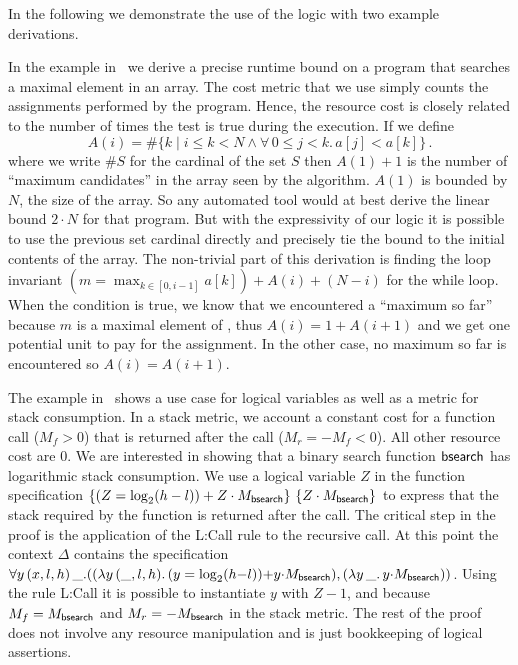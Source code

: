 \documentclass[nocopyrightspace,preprint,pldi]{sigplanconf-pldi15}
\newcommand{\pref}[1]{\prettyref{#1}}
\begin{document}
{In the following we demonstrate the use of the logic with two example
derivations.

In the example in~\pref{fig:xmplmax} we derive a precise runtime
bound on a program that searches a maximal element in an array.  The
cost metric that we use simply counts the assignments performed by the
program.  Hence, the resource cost is closely related to the
number of times the test  is true during the
execution.
%
If we define
$$
 A(i) =  \# \{ k \mid i \le k < N \land \forall\, 0 \le j < k.\, a[j] < a[k] \} \, .
$$
where we write $\# S$ for the cardinal of the set $S$ then $A(1)+1$ is
the number of ``maximum candidates'' in the array  seen
by the algorithm. $A(1)$ is bounded by $N$, the size of the array.
So any automated tool would at best derive the linear bound $2 \cdot
N$ for that program.  But with the expressivity of our logic it is
possible to use the previous set cardinal directly and precisely tie
the bound to the initial contents of the array.
%
The non-trivial part of this derivation is finding the loop invariant
$(m = \max_{k \in [0, i-1]} a[k]) + A(i) + (N-i)$ for the while loop.
When the condition  is true, we know that we
encountered a ``maximum so far'' because $m$ is a maximal element of
, thus $A(i) = 1 + A(i+1)$ and we get one
potential unit to pay for the assignment.  In the other case, no
maximum so far is encountered so $A(i) = A(i+1)$.

The example in~\pref{fig:xmplbs} shows a use case for logical
variables as well as a metric for stack consumption. In a stack
metric, we account a constant cost for a function call ($M_f>0$) that
is returned after the call ($M_r = -M_f <0$).  All other resource cost
are $0$.  We are interested in showing that a binary search function
$\mathsf{bsearch}$ has logarithmic stack consumption.  We use a logical
variable $Z$ in the function specification $\{(Z = \log_2(h-l))
  + Z \cdot M_{\mathsf{bsearch}}\}\, \, \{Z \cdot M_{\mathsf{bsearch}}\}$ to express that the stack required by the
function is returned after the call.
%
The critical step in the proof is the application of the
{\sc L:Call} rule to the recursive call.  At this point
the context $\Delta$ contains the specification
$
  \forall y \, (x,l,h) \, \_.
  ( (\lambda y \, (\_, l, h) .\, (y = \log_2(h {-} l)) {+} y {\cdot} M_{\mathsf{bsearch}})
  , (\lambda y \, \_ .\, y {\cdot} M_{\mathsf{bsearch}})
  )
$.
%
Using the rule {\sc L:Call} it is possible to instantiate $y$ with $Z
- 1$, and because $M_f = M_{\mathsf{bsearch}}$ and $M_r =
-M_{\mathsf{bsearch}}$ in the stack metric.  The rest of the proof does
not involve any resource manipulation and is just bookkeeping of
logical assertions.



}
\end{document}
